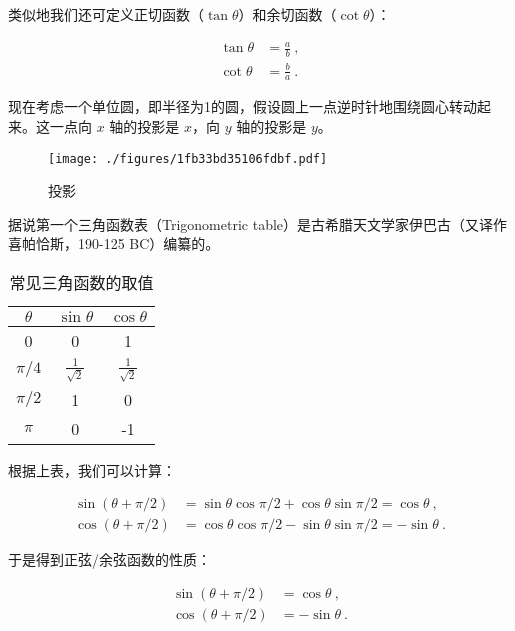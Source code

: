 类似地我们还可定义正切函数（$\tan \theta$）和余切函数（$\cot \theta$）：

\begin{equation}
\begin{aligned}
\tan \theta & = \frac{a}{b}~, \\
\cot \theta & = \frac{b}{a}~.
\end{aligned}
\end{equation}

现在考虑一个单位圆，即半径为1的圆，假设圆上一点逆时针地围绕圆心转动起来。这一点向 $x$ 轴的投影是 $x$，向 $y$ 轴的投影是 $y$。

\begin{figure}[ht]
\centering
\texttt{[image: ./figures/1fb33bd35106fdbf.pdf]}
\caption{投影} \label{fig_AtomId_6}
\end{figure}

据说第一个三角函数表（Trigonometric table）是古希腊天文学家伊巴古（又译作喜帕恰斯，190-125 BC）编纂的。

\begin{table}[ht]
\centering
\caption{常见三角函数的取值}\label{tab_AtomId_2}
\begin{tabular}{|c|c|c|}
\hline
$\theta$ & $\sin \theta$ &  $\cos \theta$ \\
\hline
0  &  0 &  1 \\
\hline
$\pi/4$ & $\frac{1}{\sqrt 2}$  & $\frac{1}{\sqrt 2}$ \\
\hline
$\pi/2$ & 1  &  0 \\
\hline
$\pi$ & 0 & -1 \\
\hline
\end{tabular}
\end{table}

根据上表，我们可以计算：

\begin{equation}
\begin{aligned}
\sin ( \theta + \pi /2) & = \sin \theta \cos \pi /2 + \cos \theta  \sin \pi/2 = \cos \theta ~,\\
\cos ( \theta + \pi /2) & = \cos  \theta \cos \pi /2 - \sin \theta \sin \pi/2 = - \sin \theta~.
\end{aligned}
\end{equation}

于是得到正弦/余弦函数的性质：

\begin{equation}
\begin{aligned}
\sin ( \theta + \pi /2 ) & = \cos \theta~, \\
\cos ( \theta + \pi /2) & = - \sin \theta~.
\end{aligned}
\end{equation}

